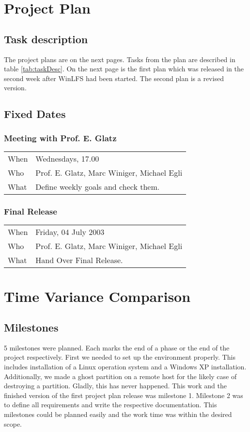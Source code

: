 \chapter{Project Plan}
\label{cha:projectPlan}

\section{Task description}
The project plans are on the next pages. Tasks from the plan are described in table \ref{tab:taskDesc}. On the next page is the first plan which was released in the second week after WinLFS had been started. The second plan is a revised version.



\section{Fixed Dates}
\subsection{Meeting with Prof. E. Glatz}
\begin{tabular}{ll}
When & Wednesdays, 17.00\\
Who  & Prof. E. Glatz, Marc Winiger, Michael Egli\\
What & Define weekly goals and check them.
\end{tabular}

\subsection{Final Release}
\begin{tabular}{ll}
When & Friday, 04 July 2003\\
Who  & Prof. E. Glatz, Marc Winiger, Michael Egli\\
What & Hand Over Final Release.
\end{tabular}

\chapter{Time Variance Comparison}
\label{cha:timeVarianceComparison}
\section{Milestones}
5 milestones were planned. Each marks the end of a phase or the end of the project respectively. First we needed to set up the environment properly. This includes installation of a Linux operation system and a Windows XP installation. Additionally, we made a ghost partition on a remote host for the likely case of destroying a partition. Gladly, this has never happened. This work and the finished version of the first project plan release was milestone 1. Milestone 2 was to define all requirements and write the respective documentation. This milestones could be planned easily and the work time was within the desired scope.

